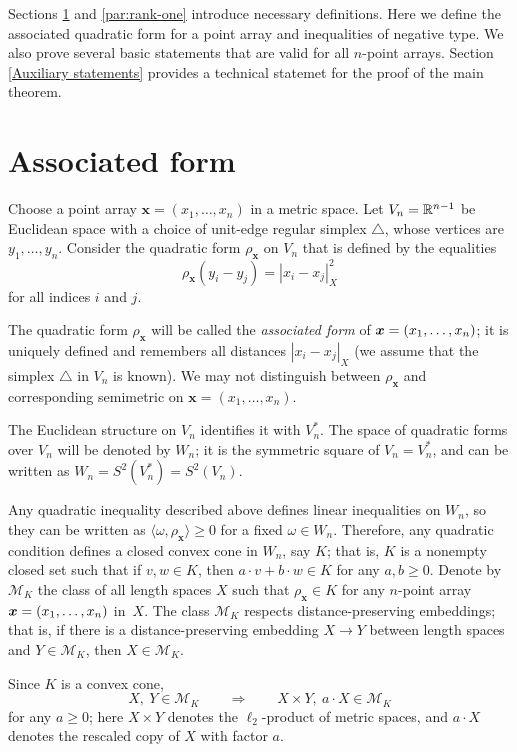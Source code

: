 \documentclass[a4paper,10pt]{article}
\begin{document}
Sections \ref{Associated form} and \ref{par:rank-one} introduce necessary definitions.
Here we define the associated quadratic form for a point array and inequalities of negative type.
We also prove several basic statements that are valid for all $n$-point arrays.
Section \ref{Auxiliary statements} provides a technical statemet for the proof of the main theorem.

\section{Associated form}\label{Associated form}

Choose a point array $\bm{x}=(x_1,\dots,x_n)$ in a metric space.
Let $V_n\z=\RR^{n-1}$ be Euclidean space with a choice of unit-edge regular simplex $\triangle$, whose vertices are $y_1,\dots,y_n$.
Consider the quadratic form $\rho_{\bm{x}}$ on $V_n$ that is defined by the equalities
\[\rho_{\bm{x}}(y_i-y_j)=|x_i-x_j|^2_X\]
for all indices $i$ and $j$.

The quadratic form $\rho_{\bm{x}}$ will be called the \emph{associated form} of $\bm{x}=(x_1,\z\dots,x_n)$;
it is uniquely defined and remembers all distances $|x_i-x_j|_X$
(we assume that the simplex $\triangle$ in $V_n$ is known).
We may not distinguish between $\rho_{\bm{x}}$ and corresponding semimetric on $\bm{x}=(x_1,\dots,x_n)$.

The Euclidean structure on $V_n$ identifies it with $V_n^*$.
The space of quadratic forms over $V_n$ will be denoted by $W_n$;
it is the symmetric square of $V_n=V_n^*$, and can be written as $W_n=S^2(V_n^*)=S^2(V_n)$.

Any quadratic inequality described above defines linear inequalities on $W_n$, so they can be written as $\langle\omega,\rho_{\bm{x}}\rangle\ge 0$ for a fixed $\omega\in W_n$.
Therefore, any quadratic  condition defines a closed convex cone in $W_n$, say $K$;
that is, $K$ is a nonempty closed set such that if $v,w\in K$, then $a\cdot v+b\cdot w\in K$ for any $a,b\ge0$.
Denote by $\mathcal{M}_K$ the class of all length spaces $X$ such that
$\rho_{\bm{x}}\in K$ for any $n$-point array $\bm{x}\z=(x_1,\dots,x_n)$ in~$X$.
The class $\mathcal{M}_K$ respects distance-preserving embeddings; that is,
if there is a distance-preserving embedding $X\to Y$ between length spaces and $Y \in  \mathcal{M}_K$, then $X\in \mathcal{M}_K$.

Since $K$ is a convex cone,
\[X,\ Y\in  \mathcal{M}_K
\qquad\Longrightarrow\qquad
X\times Y,\ a\cdot X\in\mathcal{M}_K
\]
for any $a\ge 0$;
here $X\times Y$ denotes the $\ell_2$-product of metric spaces, and
$a\cdot X$ denotes the rescaled copy of $X$ with factor $a$.
\end{document}
